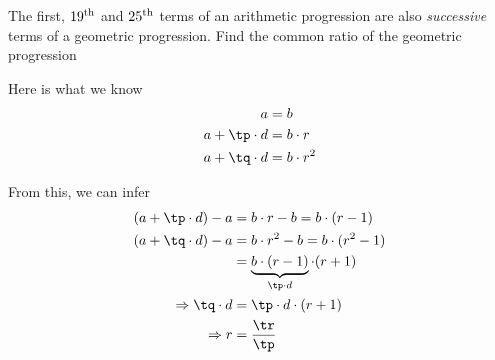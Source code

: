 



\gcalcexpr[0]
\gcalcexpr[0]
\gcalcexpr[0]\tr{\vbtwo - \vbone}

\question[3] The first, $19^\text{th}$ and $25^\text{th}$ terms of an arithmetic progression are also 
\textit{successive} terms of a geometric progression. Find the common ratio of the geometric progression


\watchout

\ifprintanswers
\fi 

\begin{solution}[\halfpage]
	Here is what we know 
	\begin{align}
		a &= b \\
		a + \tp\cdot d &= b\cdot r \\
		a + \tq\cdot d &= b\cdot r^2 
	\end{align}
	
	From this, we can infer 
	\begin{align}
		(a + \tp\cdot d) - a &= b\cdot r - b = b\cdot(r-1) \\
		(a + \tq\cdot d) - a &= b\cdot r^2 - b = b\cdot(r^2-1) \\ 
		&= \underbrace{b\cdot(r-1)}_{\tp\cdot d}\cdot(r+1) \\
		\Rightarrow \tq\cdot d &= \tp\cdot d \cdot (r + 1) \\ 
		\Rightarrow r &= \dfrac{\tr}{\tp}
	\end{align}
\end{solution}
